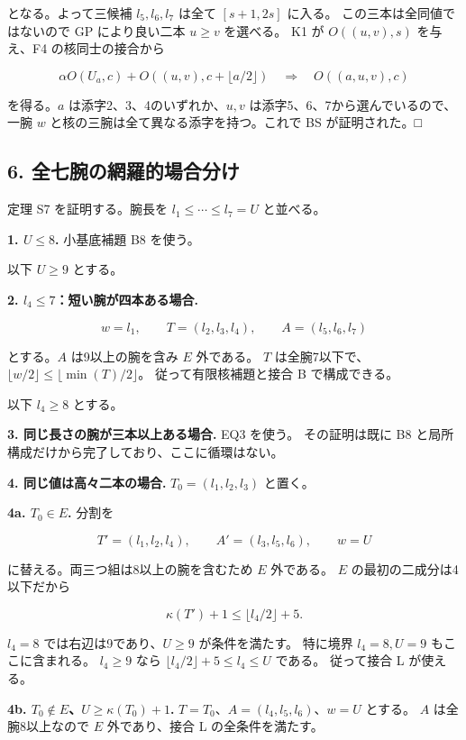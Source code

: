 \documentclass[
  10pt,
  a4paper,
]{article}
\begin{document}
となる。よって三候補 \(l_5,l_6,l_7\) は全て \([s+1,2s]\) に入る。
この三本は全同値ではないので GP により良い二本 \(u\ge v\) を選べる。 K1
が \(O((u,v),s)\) を与え、F4 の核同士の接合から

\[
\alpha O(U_a,c)+O((u,v),c+\lfloor a/2\rfloor)
\quad\Longrightarrow\quad O((a,u,v),c)
\]

を得る。\(a\) は添字2、3、4のいずれか、\(u,v\)
は添字5、6、7から選んでいるので、 一腕 \(w\)
と核の三腕は全て異なる添字を持つ。これで BS が証明された。□

\subsection{6.
全七腕の網羅的場合分け}\label{ux5168ux4e03ux8155ux306eux7db2ux7f85ux7684ux5834ux5408ux5206ux3051}

定理 S7 を証明する。腕長を \(l_1\le\cdots\le l_7=U\) と並べる。

\textbf{1. \(U\le8\).} 小基底補題 B8 を使う。

以下 \(U\ge9\) とする。

\textbf{2. \(l_4\le7\)：短い腕が四本ある場合.}

\[
w=l_1,\qquad T=(l_2,l_3,l_4),\qquad A=(l_5,l_6,l_7)
\]

とする。\(A\) は9以上の腕を含み \(E\) 外である。 \(T\)
は全腕7以下で、\(\lfloor w/2\rfloor\le\lfloor\min(T)/2\rfloor\)。
従って有限核補題と接合 B で構成できる。

以下 \(l_4\ge8\) とする。

\textbf{3. 同じ長さの腕が三本以上ある場合.} EQ3 を使う。 その証明は既に
B8 と局所構成だけから完了しており、ここに循環はない。

\textbf{4. 同じ値は高々二本の場合.} \(T_0=(l_1,l_2,l_3)\) と置く。

\textbf{4a. \(T_0\in E\).} 分割を

\[
T'=(l_1,l_2,l_4),\qquad A'=(l_3,l_5,l_6),\qquad w=U
\]

に替える。両三つ組は8以上の腕を含むため \(E\) 外である。 \(E\)
の最初の二成分は4以下だから

\[
\kappa(T')+1\le\lfloor l_4/2\rfloor+5.
\]

\(l_4=8\) では右辺は9であり、\(U\ge9\) が条件を満たす。 特に境界
\(l_4=8,U=9\) もここに含まれる。 \(l_4\ge9\) なら
\(\lfloor l_4/2\rfloor+5\le l_4\le U\) である。 従って接合 L が使える。

\textbf{4b. \(T_0\notin E\)、\(U\ge\kappa(T_0)+1\).}
\(T=T_0\)、\(A=(l_4,l_5,l_6)\)、\(w=U\) とする。 \(A\) は全腕8以上なので
\(E\) 外であり、接合 L の全条件を満たす。
\end{document}
